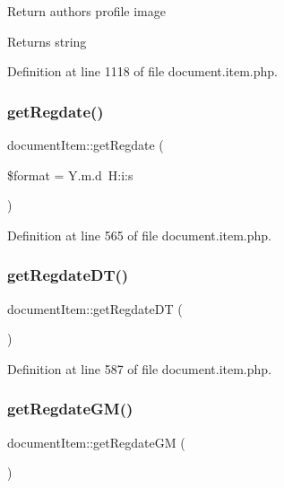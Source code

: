 Return author\textquotesingle{}s profile image \begin{DoxyReturn}{Returns}
string 
\end{DoxyReturn}


Definition at line 1118 of file document.\+item.\+php.

\mbox{\label{classdocumentItem_a7284bdd7b3fc87941585790f4a1376d7}} 
\subsubsection{\texorpdfstring{get\+Regdate()}{getRegdate()}}
{\footnotesize\ttfamily document\+Item\+::get\+Regdate (\begin{DoxyParamCaption}\item[{}]{\$format = {\ttfamily \textquotesingle{}Y.m.d~H\+:i\+:s\textquotesingle{}} }\end{DoxyParamCaption})}



Definition at line 565 of file document.\+item.\+php.

\mbox{\label{classdocumentItem_a30f4ec669361717a82e5dee9c9b3868f}} 
\subsubsection{\texorpdfstring{get\+Regdate\+D\+T()}{getRegdateDT()}}
{\footnotesize\ttfamily document\+Item\+::get\+Regdate\+DT (\begin{DoxyParamCaption}{ }\end{DoxyParamCaption})}



Definition at line 587 of file document.\+item.\+php.

\mbox{\label{classdocumentItem_a7bd6f9adea145314a87c95b13f6e0bd7}} 
\subsubsection{\texorpdfstring{get\+Regdate\+G\+M()}{getRegdateGM()}}
{\footnotesize\ttfamily document\+Item\+::get\+Regdate\+GM (\begin{DoxyParamCaption}{ }\end{DoxyParamCaption})}



